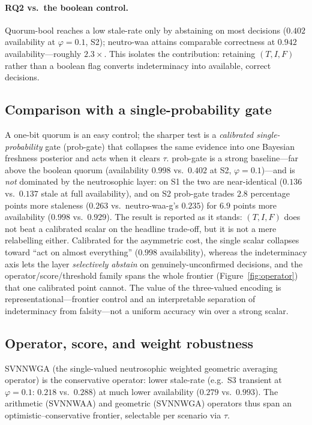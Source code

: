 \documentclass[11pt]{article}
\begin{document}
\paragraph{RQ2 vs.\ the boolean control.} Quorum-bool reaches a low stale-rate only by abstaining on
most decisions ($0.402$ availability at $\varphi=0.1$, S2); neutro-waa attains comparable correctness
at $0.942$ availability---roughly $2.3\times$. This isolates the contribution: retaining $(T,I,F)$
rather than a boolean flag converts indeterminacy into available, correct decisions.

\subsection{Comparison with a single-probability gate}
A one-bit
quorum is an easy control; the sharper test is a \emph{calibrated single-probability} gate (prob-gate)
that collapses the same evidence into one Bayesian freshness posterior and acts when it clears $\tau$.
prob-gate is a strong baseline---far above the boolean quorum (availability $0.998$ vs.\ $0.402$ at S2,
$\varphi=0.1$)---and is \emph{not} dominated by the neutrosophic layer: on S1 the two are near-identical
($0.136$ vs.\ $0.137$ stale at full availability), and on S2 prob-gate trades $2.8$ percentage points
more staleness ($0.263$ vs.\ neutro-waa-g's $0.235$) for $6.9$ points more availability ($0.998$ vs.\
$0.929$). The result is reported as it stands: $(T,I,F)$ does not beat a
calibrated scalar on the headline trade-off, but it is not a mere relabelling either. Calibrated for the
asymmetric cost, the single scalar collapses toward ``act on almost everything'' ($0.998$ availability),
whereas the indeterminacy axis lets the layer \emph{selectively abstain} on genuinely-unconfirmed
decisions, and the operator/score/threshold family spans the whole frontier
(Figure~\ref{fig:operator}) that one calibrated point cannot. The value of the three-valued encoding is
representational---frontier control and an interpretable separation of indeterminacy from falsity---not a
uniform accuracy win over a strong scalar.

\subsection{Operator, score, and weight robustness}
SVNNWGA (the single-valued neutrosophic weighted geometric averaging
operator) is the conservative operator: lower stale-rate (e.g.\ S3 transient at $\varphi=0.1$: $0.218$
vs.\ $0.288$) at much lower availability ($0.279$ vs.\ $0.993$). The arithmetic (SVNNWAA) and geometric (SVNNWGA) operators
thus span an optimistic--conservative frontier, selectable per scenario via $\tau$.
\end{document}
